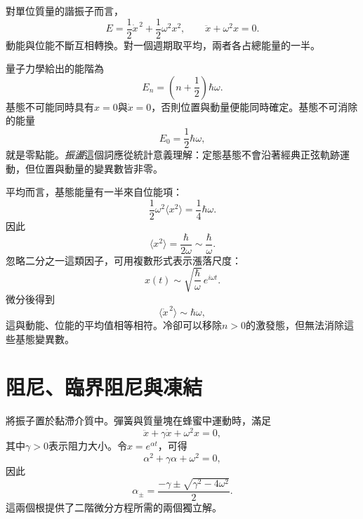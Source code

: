 對單位質量的諧振子而言，
\begin{equation}
E=\frac12\dot x^{\,2}+\frac12\omega^2x^2,
\qquad
\ddot x+\omega^2x=0.
\label{eq:c10-undamped}
\end{equation}
動能與位能不斷互相轉換。對一個週期取平均，兩者各占總能量的一半。

量子力學給出的能階為
\begin{equation}
E_n=\left(n+\frac12\right)\hbar\omega.
\label{eq:c10-oscillator-levels}
\end{equation}
基態不可能同時具有\(x=0\)與\(\dot x=0\)，否則位置與動量便能同時確定。基態不可消除的能量
\[
E_0=\frac12\hbar\omega,
\]
就是零點能。\emph{振盪}這個詞應從統計意義理解：定態基態不會沿著經典正弦軌跡運動，但位置與動量的變異數皆非零。

平均而言，基態能量有一半來自位能項：
\[
\frac12\omega^2\langle x^2\rangle
=\frac14\hbar\omega.
\]
因此
\begin{equation}
\langle x^2\rangle=\frac{\hbar}{2\omega}
\sim\frac{\hbar}{\omega}.
\label{eq:c10-zero-point-position}
\end{equation}
忽略二分之一這類因子，可用複數形式表示漲落尺度：
\[
x(t)\sim\sqrt{\frac{\hbar}{\omega}}\,e^{i\omega t}.
\]
微分後得到
\begin{equation}
\langle\dot x^{\,2}\rangle\sim\hbar\omega,
\label{eq:c10-zero-point-velocity}
\end{equation}
這與動能、位能的平均值相等相符。冷卻可以移除\(n>0\)的激發態，但無法消除這些基態變異數。

\section{阻尼、臨界阻尼與凍結}

將振子置於黏滯介質中。彈簧與質量塊在蜂蜜中運動時，滿足
\begin{equation}
\ddot x+\gamma\dot x+\omega^2x=0,
\label{eq:c10-damped}
\end{equation}
其中\(\gamma>0\)表示阻力大小。令\(x=e^{\alpha t}\)，可得
\begin{equation}
\alpha^2+\gamma\alpha+\omega^2=0,
\end{equation}
因此
\begin{equation}
\alpha_\pm
=\frac{-\gamma\pm\sqrt{\gamma^2-4\omega^2}}{2}.
\label{eq:c10-damped-roots}
\end{equation}
這兩個根提供了二階微分方程所需的兩個獨立解。

\begin{classroomqa}
\end{classroomqa}

